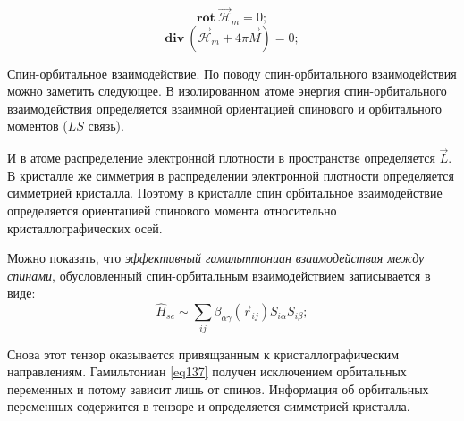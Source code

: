 \documentclass[a4paper, 14pt, russian]{article}
\newcommand{\be}{\begin{equation}}
\newcommand{\ee}{\end{equation}}
\newcommand{\rot}{\textbf{rot}~}
\renewcommand{\div}{\textbf{div}~}
\begin{document}
	\be
		\label{eq136}
		\rot \vec{\mathcal H}_m = 0;
	\ee
	\be
		\div (\vec{\mathcal H}_m + 4\pi \vec M) = 0;
	\ee

	Спин-орбитальное взаимодействие. По поводу спин-орбитального
	взаимодействия можно заметить следующее. В изолированном атоме 
	энергия спин-орбитального взаимодействия  определяется взаимной 
	ориентацией спинового и орбитального моментов ($LS$ связь).

	И в атоме распределение электронной плотности в пространстве определяется 
	$\vec L$. В кристалле же симметрия в распределении электронной плотности
	определяется симметрией кристалла. Поэтому в кристалле спин орбитальное
	взаимодействие определяется ориентацией спинового момента относительно
	кристаллографических осей.

	Можно показать, что \textit{эффективный гамильттониан взаимодействия между спинами},
	обусловленный спин-орбитальным взаимодействием записывается в виде:
	\be
		\label{eq137}
		\hat{H}_{se} \sim \sum_{ij} \beta_{\alpha \gamma}(\vec{r}_{ij}) S_{i\alpha} S_{i\beta};
	\ee

	Снова этот тензор оказывается привящзанным к кристаллографическим направлениям.
	Гамильтониан \ref{eq137} получен исключением орбитальных переменных
	и потому зависит лишь от спинов. Информация об орбитальных переменных содержится в 
	тензоре и определяется симметрией кристалла.
\end{document}
